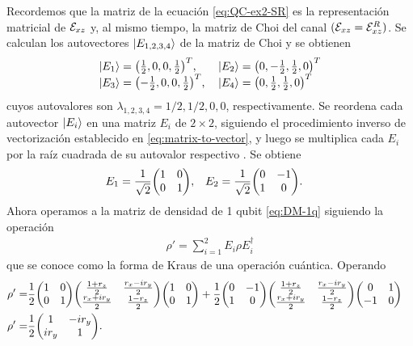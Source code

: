 Recordemos que la matriz de la ecuación \eqref{eq:QC-ex2-SR}
es la representación matricial de $\mathcal{E}_{xz}$ y, al mismo tiempo,
la matriz de Choi del canal $(\mathcal{E}_{xz}=\mathcal{E}_{xz}^R)$.  
Se calculan los autovectores $\ket{E_{1,2,3,4}}$ de 
la matriz de Choi y se obtienen
\begin{align}
\begin{tabular}{ll}
$\ket{E_1}=\mqty(\frac{1}{2},0,0,\frac{1}{2})^T$, 
& $ \ket{E_{2}}=\mqty(0,-\frac{1}{2},\frac{1}{2},0)^T$ \\
$\ket{E_{3}}=\mqty(-\frac{1}{2},0,0,\frac{1}{2})^T$, 
& $\ket{E_4}= \mqty(0,\frac{1}{2},\frac{1}{2},0)^T$
\end{tabular}
\end{align}
cuyos autovalores son $\lambda_{1,2,3,4}=1/2,1/2,0,0$, respectivamente.
Se reordena cada autovector $\ket{E_i}$ en una matriz
$E_i$ de $2\times2$, siguiendo el procedimiento 
inverso de vectorización establecido en
\eqref{eq:matrix-to-vector}, y luego se multiplica cada $E_i$ por 
la raíz cuadrada de su autovalor respectivo . Se obtiene
\begin{align}
E_1&=
\frac{1}{\sqrt{2}}
\mqty(
1 & 0\\
0 & 1
),
&
E_2&=
\frac{1}{\sqrt{2}}
\mqty(
0 & -1\\
1 & 0
).
\end{align}
Ahora operamos a la matriz de densidad de 1 qubit 
\eqref{eq:DM-1q} siguiendo la operación
\begin{align}
\rho'=\sum_{i=1}^2E_i\rho E_i^{\dagger}
\label{eq:Kraus}
\end{align}
que se conoce como la forma de Kraus de una operación cuántica. 
Operando
\begin{align}
\rho'=&
\frac{1}{2}
\mqty(
1 & 0\\
0 & 1
)
\mqty(
\frac{1+r_z}{2}& \frac{r_x-ir_y}{2}\\
\frac{r_x+ir_y}{2} & \frac{1-r_z}{2}
)
\mqty(
1 & 0\\
0 & 1
)
+
\frac{1}{2}
\mqty(
0 & -1\\
1 & 0
)
\mqty(
\frac{1+r_z}{2}& \frac{r_x-ir_y}{2}\\
\frac{r_x+ir_y}{2} & \frac{1-r_z}{2}
)
\mqty(
0 & 1\\
-1 & 0
)&
\nonumber\\
\rho'=&
\frac{1}{2}
\mqty(
1 & -ir_y\\
ir_y & 1
).
\label{eq:QC-ex2-KR}
\end{align}
